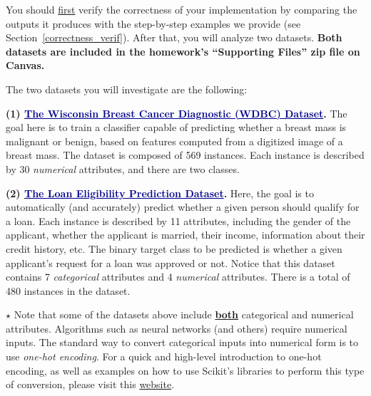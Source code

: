 \documentclass{article}
\begin{document}
\noindent You should \ul{first} verify the correctness of your implementation by comparing the outputs it produces with the step-by-step examples we provide (see Section~\ref{correctness_verif}). After that, you will analyze two datasets. \textbf{Both datasets are included in the homework’s ``Supporting Files'' zip file on Canvas.}

\vspace{0.4cm}


\noindent The two datasets you will investigate are the following:
\vspace{0.4cm}

\noindent \textbf{(1) \textcolor{darkblue}{\ul{The Wisconsin Breast Cancer Diagnostic (WDBC) Dataset}}.}
\noindent The goal here is to train a classifier capable of predicting whether a breast mass is malignant or benign, based on features computed from a digitized image of a breast mass. The dataset is composed of 569 instances. Each instance is described by 30 \textit{numerical} attributes, and there are two classes.
\vspace{0.5cm}

\noindent \textbf{(2) \textcolor{darkblue}{\ul{The Loan Eligibility Prediction Dataset}}.}
\noindent Here, the goal is to automatically (and accurately) predict whether a given person should qualify for a loan. Each instance is described by 11 attributes, including the gender of the applicant, whether the applicant is married, their income, information about their credit history, etc. The binary target class to be predicted is whether a given applicant's request for a loan was approved or not. Notice that this dataset contains 7 \textit{categorical} attributes and 4 \textit{numerical} attributes. There is a total of 480 instances in the dataset. 


\vspace{0.5cm}

\begin{mybox}[boxpink] 
    $\star$ Note that some of the datasets above include \ul{\textbf{both}} categorical and numerical attributes. Algorithms such as neural networks (and others) require numerical inputs. The standard way to convert categorical inputs into numerical form is to use \textit{one-hot encoding}. For a quick and high-level introduction to one-hot encoding, as well as examples on how to use Scikit's libraries to perform this type of conversion, please visit this \href{https://datagy.io/sklearn-one-hot-encode}{website}.
\end{mybox}
\end{document}
